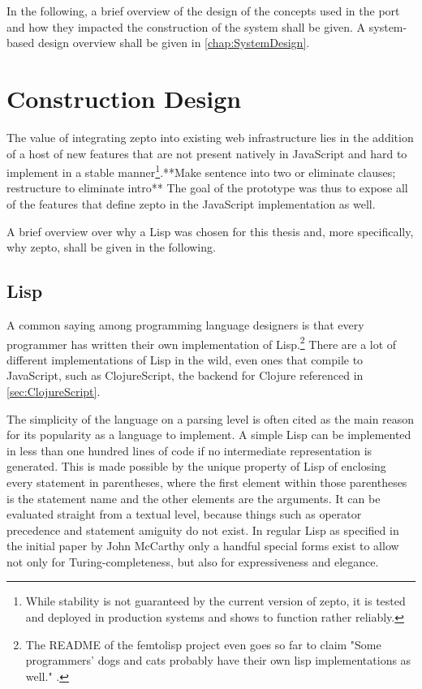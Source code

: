 \documentclass[oneside,11pt,xetex]{scrbook}
\begin{document}
In the following, a brief overview of the design of the concepts used
in the port and how they impacted the construction of the system shall be
given. A system-based design overview shall be given in \ref{chap:SystemDesign}.

\section{Construction Design}
\label{sec:ConstructionDesign}

The value of integrating zepto into existing web infrastructure lies in
the addition of a host of new features that are not present natively in
JavaScript and hard to implement in a stable manner\footnote{While stability
is not guaranteed by the current version of zepto, it is tested and deployed
in production systems and shows to function rather reliably.}.**Make sentence
into two or eliminate clauses; restructure to eliminate intro** The goal of
the prototype was thus to expose all of the features that define zepto in
the JavaScript implementation as well.

A brief overview over why a Lisp was chosen for this thesis and, more specifically,
why zepto, shall be given in the following.

\subsection{Lisp}

A common saying among programming language designers is that every programmer has written
their own implementation of Lisp.\footnote{The README of the femtolisp project even goes so
far to claim "Some programmers' dogs and cats probably have their own lisp implementations
as well." \parencite{BEZL}.} There are a lot of different implementations of Lisp
in the wild, even ones that compile to JavaScript, such as ClojureScript, the
backend for Clojure referenced in \ref{sec:ClojureScript}.

The simplicity of the language on a parsing level is often cited as the main reason for
its popularity as a language to implement.
A simple Lisp can be implemented in less than one hundred lines of code if no
intermediate representation is generated. This is made possible by the unique property
of Lisp of enclosing every statement in parentheses, where the first element within
those parentheses is the statement name and the other elements are the arguments.
It can be evaluated straight from a textual level, because things such as operator precedence
and statement amiguity do not exist. In regular Lisp as specified in the initial paper by
John McCarthy \parencite{JCM} only a handful special forms exist to allow not only for
Turing-completeness, but also for expressiveness and elegance.
\end{document}
